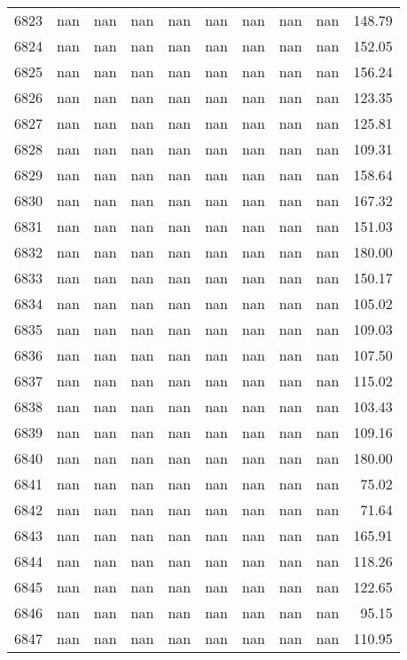 \begin{tabular}{lrrrrrrrrr}
6823 & nan & nan & nan & nan & nan & nan & nan & nan & 148.79 \\
6824 & nan & nan & nan & nan & nan & nan & nan & nan & 152.05 \\
6825 & nan & nan & nan & nan & nan & nan & nan & nan & 156.24 \\
6826 & nan & nan & nan & nan & nan & nan & nan & nan & 123.35 \\
6827 & nan & nan & nan & nan & nan & nan & nan & nan & 125.81 \\
6828 & nan & nan & nan & nan & nan & nan & nan & nan & 109.31 \\
6829 & nan & nan & nan & nan & nan & nan & nan & nan & 158.64 \\
6830 & nan & nan & nan & nan & nan & nan & nan & nan & 167.32 \\
6831 & nan & nan & nan & nan & nan & nan & nan & nan & 151.03 \\
6832 & nan & nan & nan & nan & nan & nan & nan & nan & 180.00 \\
6833 & nan & nan & nan & nan & nan & nan & nan & nan & 150.17 \\
6834 & nan & nan & nan & nan & nan & nan & nan & nan & 105.02 \\
6835 & nan & nan & nan & nan & nan & nan & nan & nan & 109.03 \\
6836 & nan & nan & nan & nan & nan & nan & nan & nan & 107.50 \\
6837 & nan & nan & nan & nan & nan & nan & nan & nan & 115.02 \\
6838 & nan & nan & nan & nan & nan & nan & nan & nan & 103.43 \\
6839 & nan & nan & nan & nan & nan & nan & nan & nan & 109.16 \\
6840 & nan & nan & nan & nan & nan & nan & nan & nan & 180.00 \\
6841 & nan & nan & nan & nan & nan & nan & nan & nan & 75.02 \\
6842 & nan & nan & nan & nan & nan & nan & nan & nan & 71.64 \\
6843 & nan & nan & nan & nan & nan & nan & nan & nan & 165.91 \\
6844 & nan & nan & nan & nan & nan & nan & nan & nan & 118.26 \\
6845 & nan & nan & nan & nan & nan & nan & nan & nan & 122.65 \\
6846 & nan & nan & nan & nan & nan & nan & nan & nan & 95.15 \\
6847 & nan & nan & nan & nan & nan & nan & nan & nan & 110.95 \\

\end{tabular}
